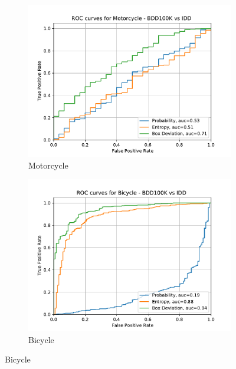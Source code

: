 \begin{figure}[H]
    	\begin{subfigure}[t]{0.495\textwidth}
    		\centering
    		\includegraphics[width=\textwidth]{images/ROC/motorcycle_ROC_bdd_vs_idd_Score_using_subens.pdf}
    		\caption{Motorcycle}
    	\end{subfigure}
    	\begin{subfigure}[t]{0.495\textwidth}
    		\centering
    		\includegraphics[width=\textwidth]{images/ROC/bicycle_ROC_bdd_vs_idd_Score_using_subens.pdf}
    		\caption{Bicycle}
    	\end{subfigure}
        	
    	

\end{figure}
